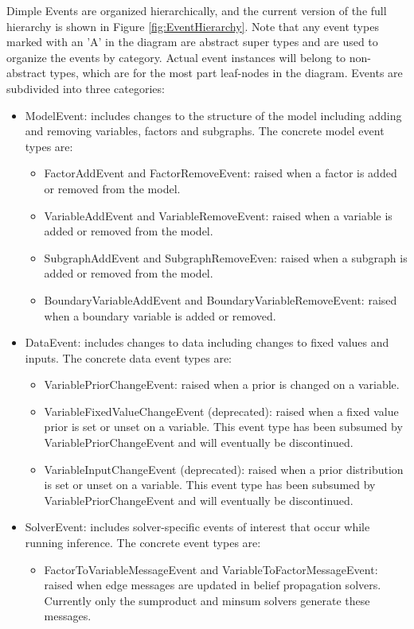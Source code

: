 Dimple Events are organized hierarchically, and the current version of the full hierarchy is shown in Figure \ref{fig:EventHierarchy}. Note that any event types marked with an 'A' in the diagram are abstract super types and are used to organize the events by category. Actual event instances will belong to non-abstract types, which are for the most part leaf-nodes in the diagram. Events are subdivided into three categories:

\begin{itemize}
\item ModelEvent: includes changes to the structure of the model including adding and removing variables, factors and subgraphs. The concrete model event types are:
  \begin{itemize}
  \item FactorAddEvent and FactorRemoveEvent: raised when a factor is added or removed from the model.
  \item VariableAddEvent and VariableRemoveEvent: raised when a variable is added or removed from the model.
  \item SubgraphAddEvent and SubgraphRemoveEven: raised when a subgraph is added or removed from the model.
  \item BoundaryVariableAddEvent and BoundaryVariableRemoveEvent: raised when a boundary variable is added or removed.
  \end{itemize}
\item DataEvent: includes changes to data including changes to fixed values and inputs. The concrete data event types are:
  \begin{itemize}
  \item VariablePriorChangeEvent: raised when a prior is changed on a variable.
  \item VariableFixedValueChangeEvent (deprecated): raised when a fixed value prior is set or unset on a variable. This event type has been subsumed by VariablePriorChangeEvent and will eventually be discontinued.
  \item VariableInputChangeEvent (deprecated): raised when a prior distribution is set or unset on a variable. This event type has been subsumed by VariablePriorChangeEvent and will eventually be discontinued.
  \end{itemize}
\item SolverEvent: includes solver-specific events of interest that occur while running inference. The concrete event types are:
  \begin{itemize}
  \item FactorToVariableMessageEvent and VariableToFactorMessageEvent: raised when edge messages are updated in belief propagation solvers. Currently only the sumproduct and minsum solvers generate these messages.

\end{itemize}
\end{itemize}
